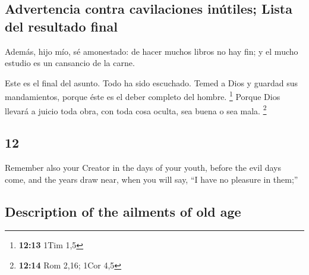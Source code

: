 \begin{paracol}{2}
\hypertarget{advertencia-contra-cavilaciones-inuxfatiles-lista-del-resultado-final}{%
\subsection{Advertencia contra cavilaciones inútiles; Lista del
resultado
final}\label{advertencia-contra-cavilaciones-inuxfatiles-lista-del-resultado-final}}

 Además, hijo mío, sé amonestado: de hacer muchos libros
no hay fin; y el mucho estudio es un cansancio de la carne.

 Este es el final del asunto. Todo ha sido escuchado.
Temed a Dios y guardad sus mandamientos, porque éste es el deber
completo del hombre. \footnote{\textbf{12:13} 1Tim 1,5} 
Porque Dios llevará a juicio toda obra, con toda cosa oculta, sea buena
o sea mala. \footnote{\textbf{12:14} Rom 2,16; 1Cor 4,5} \switchcolumn
\begin{otherlanguage}{english}

\hypertarget{section-23}{%
\section{12}\label{section-23}}

 Remember also your Creator in the days of your youth,
before the evil days come, and the years draw near, when you will say,
``I have no pleasure in them;''

\hypertarget{description-of-the-ailments-of-old-age}{%
\subsection{Description of the ailments of old
age}\label{description-of-the-ailments-of-old-age}}


\end{otherlanguage}
\end{paracol}
